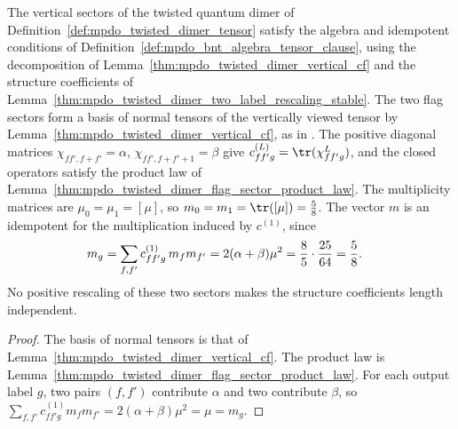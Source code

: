\begin{lemma}%
    \label{thm:mpdo_twisted_dimer_bnt_algebra_tensor_clause}
    \leanok
    The vertical sectors of the twisted quantum dimer of
    Definition~\ref{def:mpdo_twisted_dimer_tensor} satisfy the algebra and
    idempotent conditions of
    Definition~\ref{def:mpdo_bnt_algebra_tensor_clause}, using the
    decomposition of Lemma~\ref{thm:mpdo_twisted_dimer_vertical_cf} and
    the structure coefficients of
    Lemma~\ref{thm:mpdo_twisted_dimer_two_label_rescaling_stable}.
    The two flag sectors form a basis of normal tensors of the vertically
    viewed tensor by Lemma~\ref{thm:mpdo_twisted_dimer_vertical_cf}, as in
    \cite[Proposition~4.13, lines~945--959]{Cirac2016MPDO_arXiv}.
    The positive diagonal matrices
    $\chi_{ff',f+f'}=\alpha$, $\chi_{ff',f+f'+1}=\beta$ give
    $c^{(L)}_{ff'g}=\tr(\chi_{ff'g}^L)$, and the closed operators satisfy
    the product law of
    Lemma~\ref{thm:mpdo_twisted_dimer_flag_sector_product_law}.
    The multiplicity matrices are $\mu_0=\mu_1=[\mu]$, so
    $m_0=m_1=\tr([\mu])=\frac58$. The vector $m$ is an idempotent for the
    multiplication induced by $c^{(1)}$, since
    \begin{align}
        m_g & =\sum_{f,f'}c^{(1)}_{ff'g}\,m_fm_{f'}
        =2(\alpha+\beta)\mu^2=\frac85\cdot\frac{25}{64}=\frac58.
        \notag
    \end{align}
    No positive rescaling of these two sectors makes the structure
    coefficients length independent.
\end{lemma}
\begin{proof}\leanok
    The basis of normal tensors is that of
    Lemma~\ref{thm:mpdo_twisted_dimer_vertical_cf}. The product law is
    Lemma~\ref{thm:mpdo_twisted_dimer_flag_sector_product_law}.
    For each output label $g$, two pairs $(f,f')$ contribute $\alpha$ and
    two contribute $\beta$, so
    $\sum_{f,f'}c^{(1)}_{ff'g}m_fm_{f'}=2(\alpha+\beta)\mu^2=\mu=m_g$.
\end{proof}


